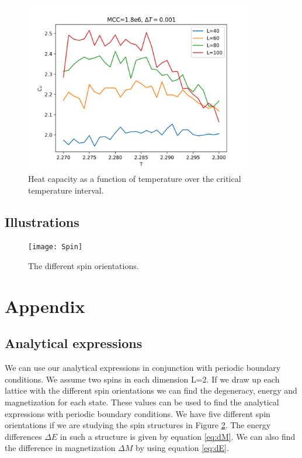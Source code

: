 \documentclass{article}
\begin{document}
\begin{figure}[H]
	\centering
	\includegraphics[width=100mm]{Exp_values_zoom.png}
	\caption{Heat capacity as a function of temperature over the critical temperature interval.}
	\label{fig:C_T}
\end{figure}

\subsection*{Illustrations}

\begin{figure}[H]
	\centering
	\texttt{[image: Spin]}
	\caption{The different spin orientations.}
	\label{fig:spinn}
\end{figure}

\clearpage
\section{Appendix}
\subsection*{Analytical expressions}

We can use our analytical expressions in conjunction with periodic boundary conditions. We assume two spins in each dimension L=2. If we draw up each lattice with the different spin orientations we can find the degeneracy, energy and magnetization for each state. These values can be used to find the analytical expressions with periodic boundary conditions. We have five different spin orientations if we are studying the spin structures in Figure \ref{fig:spinn}. The energy differences $\Delta E$ in such a structure is given by equation \ref{eq:dM}. We can also find the difference in magnetization $\Delta M$ by using equation \ref{eq:dE}.
\end{document}
